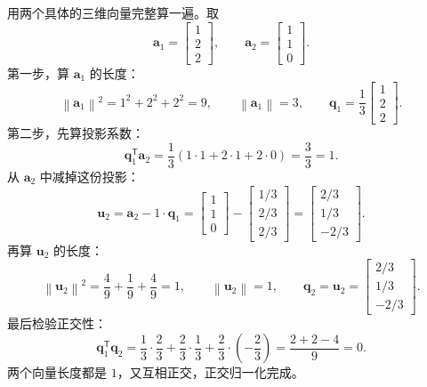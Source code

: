 \documentclass[UTF8,a4paper,12pt]{ctexart}
\numberwithin{equation}{section}
\newcommand{\norm}[1]{\left\lVert #1 \right\rVert}
\newcommand{\trans}{^{\mathsf T}}
\begin{document}
	用两个具体的三维向量完整算一遍。取
	\begin{equation}\label{eq:6.86}
	\bm{a}_1=
	\begin{bmatrix}
		1\\
		2\\
		2
	\end{bmatrix},
	\qquad
	\bm{a}_2=
	\begin{bmatrix}
		1\\
		1\\
		0
	\end{bmatrix}.
	\end{equation}
	第一步，算 $\bm{a}_1$ 的长度：
	\begin{equation}\label{eq:6.87}
	\norm{\bm{a}_1}^2=1^2+2^2+2^2=9,
	\qquad
	\norm{\bm{a}_1}=3,
	\qquad
	\bm{q}_1=\frac{1}{3}
	\begin{bmatrix}
		1\\
		2\\
		2
	\end{bmatrix}.
	\end{equation}
	第二步，先算投影系数：
	\begin{equation}\label{eq:6.88}
	\bm{q}_1\trans\bm{a}_2
	=\frac{1}{3}(1\cdot1+2\cdot1+2\cdot0)
	=\frac{3}{3}
	=1.
	\end{equation}
	从 $\bm{a}_2$ 中减掉这份投影：
	\begin{equation}\label{eq:6.89}
	\bm{u}_2
	=\bm{a}_2-1\cdot\bm{q}_1
	=
	\begin{bmatrix}
		1\\
		1\\
		0
	\end{bmatrix}
	-
	\begin{bmatrix}
		1/3\\
		2/3\\
		2/3
	\end{bmatrix}
	=
	\begin{bmatrix}
		2/3\\
		1/3\\
		-2/3
	\end{bmatrix}.
	\end{equation}
	再算 $\bm{u}_2$ 的长度：
	\begin{equation}\label{eq:6.90}
	\norm{\bm{u}_2}^2=\frac{4}{9}+\frac{1}{9}+\frac{4}{9}=1,
	\qquad
	\norm{\bm{u}_2}=1,
	\qquad
	\bm{q}_2=\bm{u}_2=
	\begin{bmatrix}
		2/3\\
		1/3\\
		-2/3
	\end{bmatrix}.
	\end{equation}
	最后检验正交性：
	\begin{equation}\label{eq:6.91}
	\bm{q}_1\trans\bm{q}_2
	=\frac{1}{3}\cdot\frac{2}{3}+\frac{2}{3}\cdot\frac{1}{3}+\frac{2}{3}\cdot\left(-\frac{2}{3}\right)
	=\frac{2+2-4}{9}
	=0.
	\end{equation}
	两个向量长度都是 $1$，又互相正交，正交归一化完成。
\end{document}
